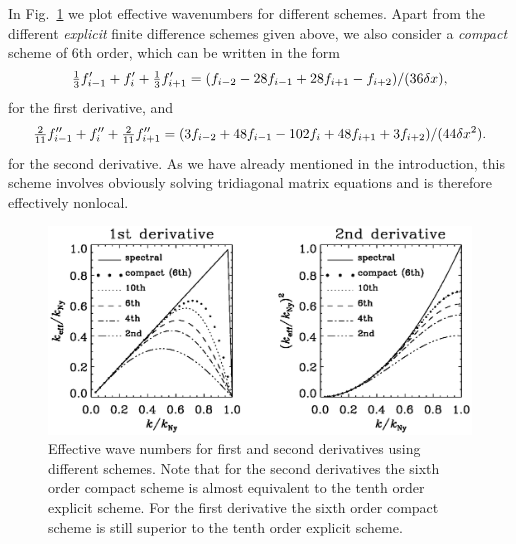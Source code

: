 \documentclass[\mydriver,12pt,twoside,notitlepage,a4paper]{article}
\begin{document}
In Fig.~\ref{Fpkeff} we plot effective wavenumbers for different schemes.
Apart from the different {\it explicit} finite difference schemes
given above, we also consider a {\it compact} scheme of 6th order,
which can be written in the form
\begin{equation}
{\textstyle{1\over3}}f'_{i-1}+f'_i+{\textstyle{1\over3}}f'_{i+1}
=(f_{i-2}-28f_{i-1}+28f_{i+1}-f_{i+2})/(36\delta x),
\end{equation}
for the first derivative, and
\begin{equation}
{\textstyle{2\over11}}f''_{i-1}+f''_i+{\textstyle{2\over11}}f''_{i+1}
=(3f_{i-2}+48f_{i-1}-102f_i+48f_{i+1}+3f_{i+2})/(44\delta x^2).
\end{equation}
for the second derivative. As we have already mentioned in the introduction, this
scheme involves obviously solving tridiagonal matrix equations and is
therefore effectively nonlocal.

\begin{figure}[h!]\begin{center}\includegraphics[width=.99\textwidth]
{pkeff}\end{center}\caption[]{
Effective wave numbers for first and second derivatives using different
schemes. Note that for the second derivatives the sixth order compact
scheme is almost equivalent to the tenth order explicit scheme. For the
first derivative the sixth order compact scheme is still superior to the
tenth order explicit scheme.
}\label{Fpkeff}\end{figure}
\end{document}
